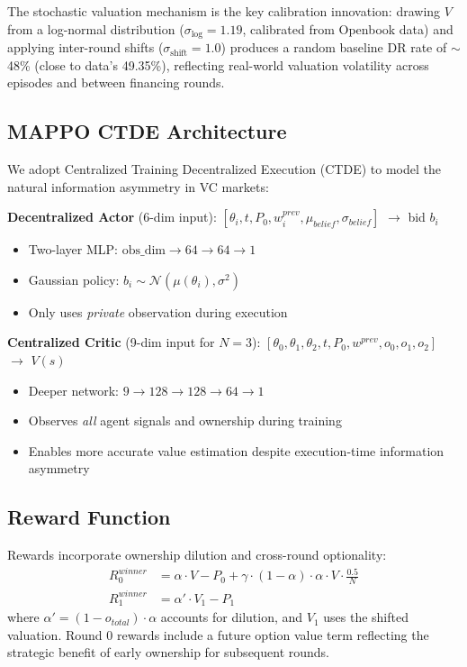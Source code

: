 \documentclass[11pt,a4paper]{article}
\begin{document}
The stochastic valuation mechanism is the key calibration innovation: drawing $V$ from a log-normal distribution ($\sigma_{\log}=1.19$, calibrated from Openbook data) and applying inter-round shifts ($\sigma_{\text{shift}}=1.0$) produces a random baseline DR rate of $\sim$48\% (close to data's 49.35\%), reflecting real-world valuation volatility across episodes and between financing rounds.

\subsection{MAPPO CTDE Architecture}

We adopt Centralized Training Decentralized Execution (CTDE) to model the natural information asymmetry in VC markets:

\textbf{Decentralized Actor} (6-dim input): $[\theta_i, t, P_0, w_{i}^{prev}, \mu_{belief}, \sigma_{belief}]$ $\rightarrow$ bid $b_i$
\begin{itemize}[nosep]
  \item Two-layer MLP: $\text{obs\_dim} \rightarrow 64 \rightarrow 64 \rightarrow 1$
  \item Gaussian policy: $b_i \sim \mathcal{N}(\mu(\theta_i), \sigma^2)$
  \item Only uses \emph{private} observation during execution
\end{itemize}

\textbf{Centralized Critic} (9-dim input for $N=3$): $[\theta_0, \theta_1, \theta_2, t, P_0, w^{prev}, o_0, o_1, o_2]$ $\rightarrow$ $V(s)$
\begin{itemize}[nosep]
  \item Deeper network: $9 \rightarrow 128 \rightarrow 128 \rightarrow 64 \rightarrow 1$
  \item Observes \emph{all} agent signals and ownership during training
  \item Enables more accurate value estimation despite execution-time information asymmetry
\end{itemize}

\subsection{Reward Function}

Rewards incorporate ownership dilution and cross-round optionality:
\begin{align}
R_0^{winner} &= \alpha \cdot V - P_0 + \gamma \cdot (1-\alpha) \cdot \alpha \cdot V \cdot \frac{0.5}{N} \\
R_1^{winner} &= \alpha' \cdot V_1 - P_1
\end{align}
where $\alpha' = (1 - o_{total}) \cdot \alpha$ accounts for dilution, and $V_1$ uses the shifted valuation. Round 0 rewards include a future option value term reflecting the strategic benefit of early ownership for subsequent rounds.
\end{document}
